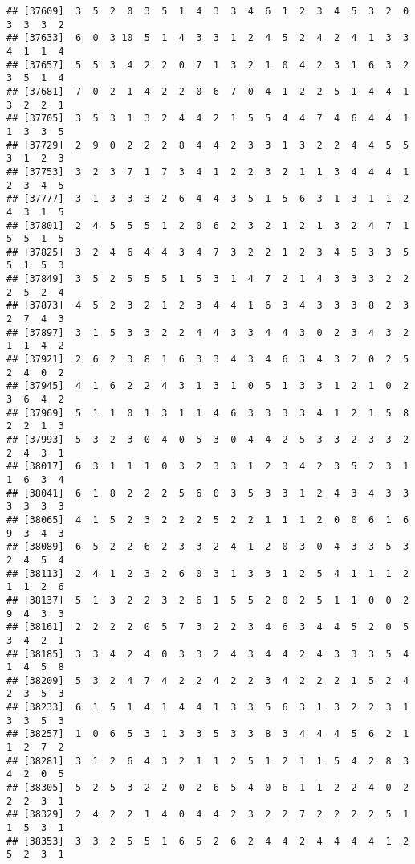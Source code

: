 \documentclass[
]{article}
\begin{document}
\begin{verbatim}
## [37609]  3  5  2  0  3  5  1  4  3  3  4  6  1  2  3  4  5  3  2  0  3  3  3  2
## [37633]  6  0  3 10  5  1  4  3  3  1  2  4  5  2  4  2  4  1  3  3  4  1  1  4
## [37657]  5  5  3  4  2  2  0  7  1  3  2  1  0  4  2  3  1  6  3  2  3  5  1  4
## [37681]  7  0  2  1  4  2  2  0  6  7  0  4  1  2  2  5  1  4  4  1  3  2  2  1
## [37705]  3  5  3  1  3  2  4  4  2  1  5  5  4  4  7  4  6  4  4  1  1  3  3  5
## [37729]  2  9  0  2  2  2  8  4  4  2  3  3  1  3  2  2  4  4  5  5  3  1  2  3
## [37753]  3  2  3  7  1  7  3  4  1  2  2  3  2  1  1  3  4  4  4  1  2  3  4  5
## [37777]  3  1  3  3  3  2  6  4  4  3  5  1  5  6  3  1  3  1  1  2  4  3  1  5
## [37801]  2  4  5  5  5  1  2  0  6  2  3  2  1  2  1  3  2  4  7  1  5  5  1  5
## [37825]  3  2  4  6  4  4  3  4  7  3  2  2  1  2  3  4  5  3  3  5  5  1  5  3
## [37849]  3  5  2  5  5  5  1  5  3  1  4  7  2  1  4  3  3  3  2  2  2  5  2  4
## [37873]  4  5  2  3  2  1  2  3  4  4  1  6  3  4  3  3  3  8  2  3  2  7  4  3
## [37897]  3  1  5  3  3  2  2  4  4  3  3  4  4  3  0  2  3  4  3  2  1  1  4  2
## [37921]  2  6  2  3  8  1  6  3  3  4  3  4  6  3  4  3  2  0  2  5  2  4  0  2
## [37945]  4  1  6  2  2  4  3  1  3  1  0  5  1  3  3  1  2  1  0  2  3  6  4  2
## [37969]  5  1  1  0  1  3  1  1  4  6  3  3  3  3  4  1  2  1  5  8  2  2  1  3
## [37993]  5  3  2  3  0  4  0  5  3  0  4  4  2  5  3  3  2  3  3  2  2  4  3  1
## [38017]  6  3  1  1  1  0  3  2  3  3  1  2  3  4  2  3  5  2  3  1  1  6  3  4
## [38041]  6  1  8  2  2  2  5  6  0  3  5  3  3  1  2  4  3  4  3  3  3  3  3  3
## [38065]  4  1  5  2  3  2  2  2  5  2  2  1  1  1  2  0  0  6  1  6  9  3  4  3
## [38089]  6  5  2  2  6  2  3  3  2  4  1  2  0  3  0  4  3  3  5  3  2  4  5  4
## [38113]  2  4  1  2  3  2  6  0  3  1  3  3  1  2  5  4  1  1  1  2  1  1  2  6
## [38137]  5  1  3  2  2  3  2  6  1  5  5  2  0  2  5  1  1  0  0  2  9  4  3  3
## [38161]  2  2  2  2  0  5  7  3  2  2  3  4  6  3  4  4  5  2  0  5  3  4  2  1
## [38185]  3  3  4  2  4  0  3  3  2  4  3  4  4  2  4  3  3  3  5  4  1  4  5  8
## [38209]  5  3  2  4  7  4  2  2  4  2  2  3  4  2  2  2  1  5  2  4  2  3  5  3
## [38233]  6  1  5  1  4  1  4  4  1  3  3  5  6  3  1  3  2  2  3  1  3  3  5  3
## [38257]  1  0  6  5  3  1  3  3  5  3  3  8  3  4  4  4  5  6  2  1  1  2  7  2
## [38281]  3  1  2  6  4  3  2  1  1  2  5  1  2  1  1  5  4  2  8  3  4  2  0  5
## [38305]  5  2  5  3  2  2  0  2  6  5  4  0  6  1  1  2  2  4  0  2  2  2  3  1
## [38329]  2  4  2  2  1  4  0  4  4  2  3  2  2  7  2  2  2  2  5  1  1  5  3  1
## [38353]  3  3  2  5  5  1  6  5  2  6  2  4  4  2  4  4  4  4  1  2  5  2  3  1

\end{verbatim}
\end{document}
